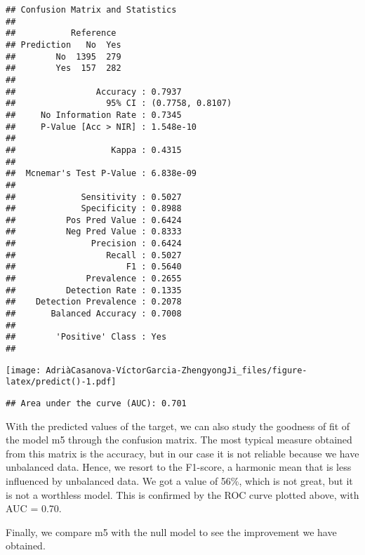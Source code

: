 \documentclass[
]{article}
\newenvironment{Shaded}{\begin{snugshade}}{\end{snugshade}}
\newcommand{\FunctionTok}[1]{\textcolor[rgb]{0.13,0.29,0.53}{\textbf{#1}}}
\newcommand{\NormalTok}[1]{#1}
\newcommand{\SpecialCharTok}[1]{\textcolor[rgb]{0.81,0.36,0.00}{\textbf{#1}}}
\begin{document}
\begin{verbatim}
## Confusion Matrix and Statistics
## 
##           Reference
## Prediction   No  Yes
##        No  1395  279
##        Yes  157  282
##                                           
##                Accuracy : 0.7937          
##                  95% CI : (0.7758, 0.8107)
##     No Information Rate : 0.7345          
##     P-Value [Acc > NIR] : 1.548e-10       
##                                           
##                   Kappa : 0.4315          
##                                           
##  Mcnemar's Test P-Value : 6.838e-09       
##                                           
##             Sensitivity : 0.5027          
##             Specificity : 0.8988          
##          Pos Pred Value : 0.6424          
##          Neg Pred Value : 0.8333          
##               Precision : 0.6424          
##                  Recall : 0.5027          
##                      F1 : 0.5640          
##              Prevalence : 0.2655          
##          Detection Rate : 0.1335          
##    Detection Prevalence : 0.2078          
##       Balanced Accuracy : 0.7008          
##                                           
##        'Positive' Class : Yes             
## 
\end{verbatim}

\begin{Shaded}
\end{Shaded}

\texttt{[image: AdriàCasanova-VíctorGarcia-ZhengyongJi\_files/figure-latex/predict()-1.pdf]}

\begin{verbatim}
## Area under the curve (AUC): 0.701
\end{verbatim}

With the predicted values of the target, we can also study the goodness
of fit of the model m5 through the confusion matrix. The most typical
measure obtained from this matrix is the accuracy, but in our case it is
not reliable because we have unbalanced data. Hence, we resort to the
F1-score, a harmonic mean that is less influenced by unbalanced data. We
got a value of 56\%, which is not great, but it is not a worthless
model. This is confirmed by the ROC curve plotted above, with AUC =
0.70.

Finally, we compare m5 with the null model to see the improvement we
have obtained.
\end{document}
